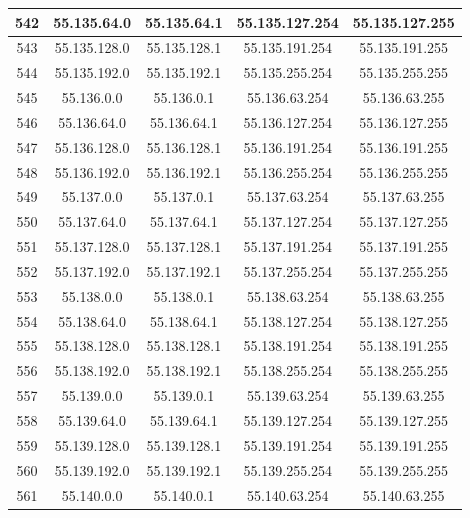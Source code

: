 \documentclass[letterpaper,12pt]{article}
\begin{document}
\begin{center}
\begin{longtable}{|c|c|c|c|c|}
                542 & 55.135.64.0 & 55.135.64.1 & 55.135.127.254 & 55.135.127.255 \\ \hline
                543 & 55.135.128.0 & 55.135.128.1 & 55.135.191.254 & 55.135.191.255 \\ \hline
                544 & 55.135.192.0 & 55.135.192.1 & 55.135.255.254 & 55.135.255.255 \\ \hline
                545 & 55.136.0.0 & 55.136.0.1 & 55.136.63.254 & 55.136.63.255 \\ \hline
                546 & 55.136.64.0 & 55.136.64.1 & 55.136.127.254 & 55.136.127.255 \\ \hline
                547 & 55.136.128.0 & 55.136.128.1 & 55.136.191.254 & 55.136.191.255 \\ \hline
                548 & 55.136.192.0 & 55.136.192.1 & 55.136.255.254 & 55.136.255.255 \\ \hline
                549 & 55.137.0.0 & 55.137.0.1 & 55.137.63.254 & 55.137.63.255 \\ \hline
                550 & 55.137.64.0 & 55.137.64.1 & 55.137.127.254 & 55.137.127.255 \\ \hline
                551 & 55.137.128.0 & 55.137.128.1 & 55.137.191.254 & 55.137.191.255 \\ \hline
                552 & 55.137.192.0 & 55.137.192.1 & 55.137.255.254 & 55.137.255.255 \\ \hline
                553 & 55.138.0.0 & 55.138.0.1 & 55.138.63.254 & 55.138.63.255 \\ \hline
                554 & 55.138.64.0 & 55.138.64.1 & 55.138.127.254 & 55.138.127.255 \\ \hline
                555 & 55.138.128.0 & 55.138.128.1 & 55.138.191.254 & 55.138.191.255 \\ \hline
                556 & 55.138.192.0 & 55.138.192.1 & 55.138.255.254 & 55.138.255.255 \\ \hline
                557 & 55.139.0.0 & 55.139.0.1 & 55.139.63.254 & 55.139.63.255 \\ \hline
                558 & 55.139.64.0 & 55.139.64.1 & 55.139.127.254 & 55.139.127.255 \\ \hline
                559 & 55.139.128.0 & 55.139.128.1 & 55.139.191.254 & 55.139.191.255 \\ \hline
                560 & 55.139.192.0 & 55.139.192.1 & 55.139.255.254 & 55.139.255.255 \\ \hline
                561 & 55.140.0.0 & 55.140.0.1 & 55.140.63.254 & 55.140.63.255 \\ \hline

\end{longtable}
\end{center}
\end{document}
